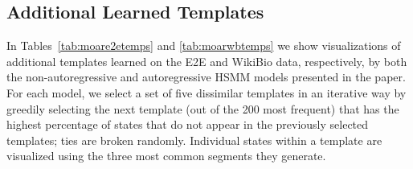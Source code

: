 \documentclass[11pt,a4paper]{article}
\begin{document}
\subsection{Additional Learned Templates}
In Tables~\ref{tab:moare2etemps} and \ref{tab:moarwbtemps} we show visualizations of additional templates learned on the E2E and WikiBio data, respectively, by both the non-autoregressive and autoregressive HSMM models presented in the paper. For each model, we select a set of five dissimilar templates in an iterative way by greedily selecting the next template (out of the 200 most frequent) that has the highest percentage of states that do not appear in the previously selected templates; ties are broken randomly. Individual states within a template are visualized using the three most common segments they generate.

\newcommand{\tslot}[3]{$\textcolor{gray}{|} \ \substack{\text{#1}\\\text{#2}\\\text{#3}\\\dots}$}
\end{document}
